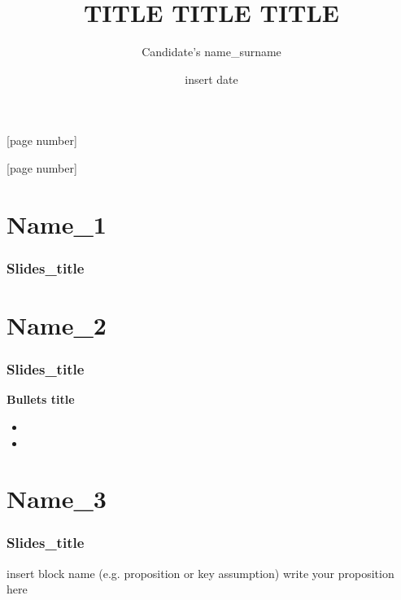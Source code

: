 \documentclass{beamer}
\title[Master's Thesis\_or title in short]{TITLE TITLE TITLE} %
\author[name\_surname]{\texorpdfstring{{\normalsize Candidate's name\_surname}}{Author}}
\institute[STUDENT ID] %
{

{\small Supervisor/s}\\
\medskip
{\small Professor insert\_here\_professor's\_name\_and\_surname}\\
\vspace{2cm}
\medskip
Department of Economics\\
University of Bergamo%

}
\date{insert date} %
\begin{document}
\begin{frame}
\titlepage %
[page number]

\end{frame}
[page number]



\section{Name\_1} 
\begin{frame}[allowframebreaks]
\frametitle{Slides\_title}


\end{frame}



\section{Name\_2}
\begin{frame}[allowframebreaks]
\frametitle{Slides\_title}
\textbf{Bullets title}
\vspace{0.3cm}
\begin{itemize}
\item 
\vspace{0.15cm}
\item 
\end{itemize}

\end{frame}


\section{Name\_3}
\begin{frame}[allowframebreaks]
\frametitle{Slides\_title}\small

\begin{block}{insert block name (e.g. proposition or key assumption)}
    write your proposition here
\end{block} %




\end{frame}
\end{document}
